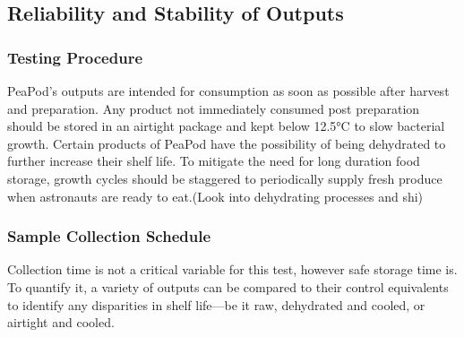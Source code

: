 

\clearpage

\subsection{Reliability and Stability of Outputs}


\subsubsection{Testing Procedure}

PeaPod's outputs are intended for consumption as soon as possible after harvest and preparation. Any product not immediately consumed post preparation should be stored in an airtight package and kept below 12.5°C to slow bacterial growth. Certain products of PeaPod have the possibility of being dehydrated to further increase their shelf life. 
To mitigate the need for long duration food storage, growth cycles should be staggered to periodically supply fresh produce when astronauts are ready to eat.(Look into dehydrating processes and shi)


\subsubsection{Sample Collection Schedule}

Collection time is not a critical variable for this test, however safe storage time is. To quantify it, a variety of outputs can be compared to their control equivalents to identify any disparities in shelf life---be it raw, dehydrated and cooled, or airtight and cooled.

